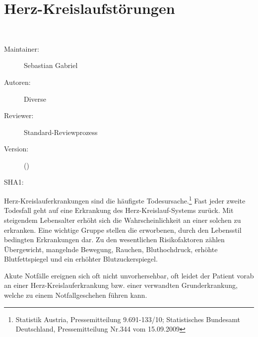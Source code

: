 \chapter
[\CO{[HKL]} Herz-Kreislaufstörungen]
{\CC{[HKL]} Herz-Kreislaufstörungen}
\ChapterIntro
{%
~~~
}
{%
\begin{description}
  \item[Maintainer:] Sebastian Gabriel
  \item[Autoren:] Diverse
  \item[Reviewer:] Standard-Reviewprozess
  \item[Version:] {\DocVersion} ({\DocVersionInfo})
  \item[SHA1:] {\DocGitCommit}
\end{description}

{\TxTeilkapitelAASS}
}


Herz-Kreislauferkrankungen sind die häufigste
Todesursache.\footnote{Statistik Austria, Pressemitteilung
9.691-133/10; Statistisches Bundesamt Deutschland,
Pressemitteilung Nr.344 vom 15.09.2009} Fast jeder zweite
Todesfall geht auf eine Erkrankung des
Herz-Kreislauf-Systems zurück.  Mit steigendem Lebensalter
erhöht sich die Wahrscheinlichkeit an einer solchen zu
erkranken. 
Eine wichtige Gruppe stellen die erworbenen, durch den
Lebensstil bedingten Erkrankungen dar. Zu den wesentlichen
Risikofaktoren zählen Übergewicht, mangelnde Bewegung,
Rauchen, Bluthochdruck, erhöhte Blutfettspiegel und ein
erhöhter Blutzuckerspiegel.

Akute Notfälle ereignen sich oft nicht unvorhersehbar, oft
leidet der Patient vorab an  einer
Herz-Kreislauferkrankung bzw. einer verwandten
Grunderkrankung, welche zu einem Notfallgeschehen führen
kann.



